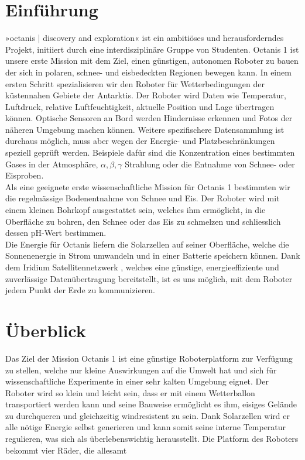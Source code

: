 \documentclass[a4paper,12pt]{article}
\begin{document}
\tableofcontents

\pagebreak

\section{Einführung}
»octanis | discovery and exploration« \cite{octanis} ist ein ambitiöses und herausforderndes Projekt, initiiert durch eine interdisziplinäre Gruppe von Studenten. Octanis 1 ist unsere erste Mission mit dem Ziel, einen günstigen, autonomen Roboter zu bauen der sich in polaren, schnee- und eisbedeckten Regionen bewegen kann. In einem ersten Schritt spezialisieren wir den Roboter für Wetterbedingungen der küstennahen Gebiete der Antarktis. Der Roboter wird Daten wie Temperatur, Luftdruck, relative Luftfeuchtigkeit, aktuelle Position und Lage übertragen können. Optische Sensoren an Bord werden Hindernisse erkennen und Fotos der näheren Umgebung machen können. Weitere spezifischere Datensammlung ist durchaus möglich, muss aber wegen der Energie- und Platzbeschränkungen speziell geprüft werden. Beispiele dafür sind die Konzentration eines bestimmten Gases in der Atmosphäre, $\alpha, \beta, \gamma$ Strahlung oder die Entnahme von Schnee- oder Eisproben. \\
Als eine geeignete erste wissenschaftliche Mission für Octanis 1 \cite{krishnakant} bestimmten wir die regelmässige Bodenentnahme von Schnee und Eis. Der Roboter wird mit einem kleinen Bohrkopf ausgestattet sein, welches ihm ermöglicht, in die Oberfläche zu bohren, den Schnee oder das Eis zu schmelzen und schliesslich dessen pH-Wert bestimmen.\\ 
Die Energie für Octanis liefern die Solarzellen auf seiner Oberfläche, welche die Sonnenenergie in Strom umwandeln und in einer Batterie speichern können. Dank dem Iridium Satellitennetzwerk \cite{iridium}, welches eine günstige, energieeffiziente und zuverlässige Datenübertragung bereitstellt, ist es uns möglich, mit dem Roboter jedem Punkt der Erde zu kommunizieren.


\section{Überblick}

Das Ziel der Mission Octanis 1 ist eine günstige Roboterplatform zur Verfügung zu stellen, welche nur kleine Auswirkungen auf die Umwelt hat und sich für wissenschaftliche Experimente in einer sehr kalten Umgebung eignet. Der Roboter wird so klein und leicht sein, dass er mit einem Wetterballon transportiert werden kann und seine Bauweise ermöglicht es ihm, eisiges Gelände zu durchqueren und gleichzeitig windresistent zu sein. Dank Solarzellen wird er alle nötige Energie selbst generieren und kann somit seine interne Temperatur regulieren, was sich als überlebenswichtig herausstellt. Die Platform des Roboters bekommt vier Räder, die allesamt 
\end{document}
